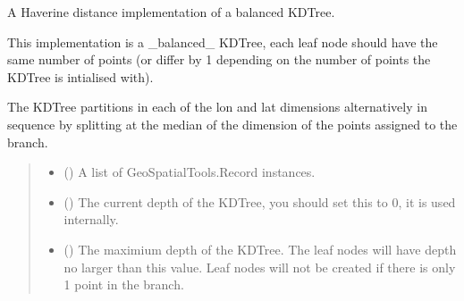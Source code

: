 \documentclass[letterpaper,10pt,english]{sphinxmanual}
\begin{document}
\begin{fulllineitems}
\label{\detokenize{users_guide:GeoSpatialTools.kdtree.KDTree}}
\pysigstartsignatures
{}
\pysigstopsignatures
\sphinxAtStartPar
A Haverine distance implementation of a balanced KDTree.

\sphinxAtStartPar
This implementation is a \_balanced\_ KDTree, each leaf node should have the
same number of points (or differ by 1 depending on the number of points
the KDTree is intialised with).

\sphinxAtStartPar
The KDTree partitions in each of the lon and lat dimensions alternatively
in sequence by splitting at the median of the dimension of the points
assigned to the branch.
\begin{quote}\begin{description}
\begin{itemize}
\item {} 
\sphinxAtStartPar
{} (\sphinxstyleliteralemphasis{\sphinxupquote{{[}}}{\hyperref[\detokenize{users_guide:GeoSpatialTools.quadtree.Record}]{\sphinxcrossref{\sphinxstyleliteralemphasis{\sphinxupquote{Record}}}}}\sphinxstyleliteralemphasis{\sphinxupquote{{]}}}) \textendash{} A list of GeoSpatialTools.Record instances.

\item {} 
\sphinxAtStartPar
{} () \textendash{} The current depth of the KDTree, you should set this to 0, it is used
internally.

\item {} 
\sphinxAtStartPar
{} () \textendash{} The maximium depth of the KDTree. The leaf nodes will have depth no
larger than this value. Leaf nodes will not be created if there is
only 1 point in the branch.

\end{itemize}

\end{description}\end{quote}


\end{fulllineitems}
\end{document}

